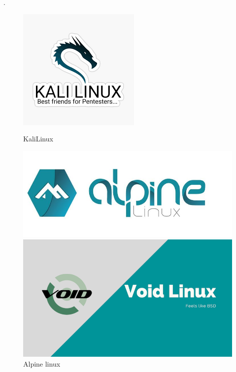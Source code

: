 \begin{itemize}[leftmargin=*,nosep]
   .\begin{figure}[!hbt!]
  \centering
  \begin{minipage}[b]{0.18\textwidth}
    \includegraphics[width=\textwidth]{images_pfe/kalilinux.png}
    \caption{KaliLinux}
  \end{minipage}\hfill
  \begin{minipage}[b]{0.18\textwidth}
    \includegraphics[width=\textwidth]{images_pfe/alpine.jpg}
    \caption{Alpine linux }
  \end{minipage}\hfill
  \begin{minipage}[b]{0.18\textwidth}
    \includegraphics[width=\textwidth]{images_pfe/void.png}

\end{minipage}
\end{figure}
\end{itemize}
